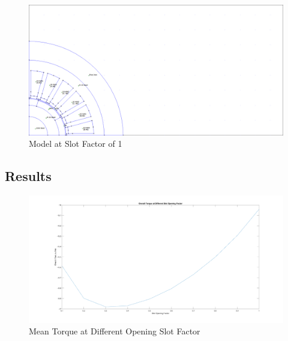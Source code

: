 \documentclass[12pt]{article}
\begin{document}
\begin{figure}[H]
    \centering
    \includegraphics[height=0.8\linewidth, trim={0 0 29cm 185}, clip]{img/task_10_models/task_10_1.0.png}
    \caption{Model at Slot Factor of 1}
    \label{fig:task-9-1-sf}
\end{figure}


\subsection{Results}

\begin{figure}[H]
    \centering
    \includegraphics[width=\linewidth]{img/task_10_overall_torque.png}
    \caption{Mean Torque at Different Opening Slot Factor}
    \label{fig:task-10-torque}
\end{figure}
\end{document}
